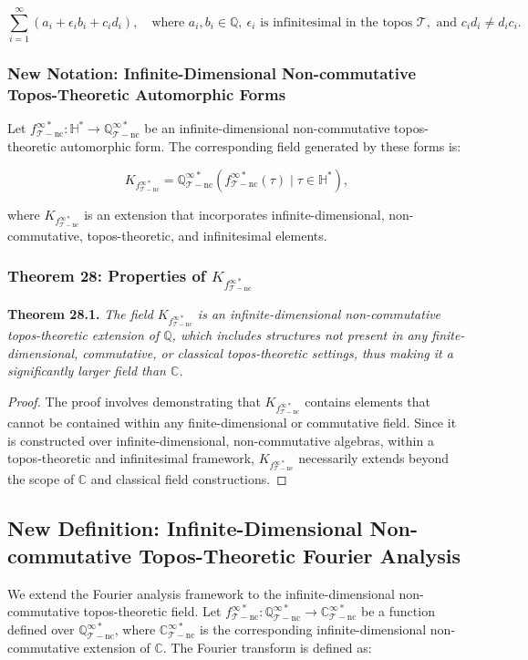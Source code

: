 \documentclass{article}
\begin{document}
\[
\sum_{i=1}^{\infty} \left( a_i + \epsilon_i b_i + c_i d_i \right), \quad \text{where } a_i, b_i \in \mathbb{Q}, \ \epsilon_i \text{ is infinitesimal in the topos } \mathcal{T}, \text{ and } c_i d_i \neq d_i c_i.
\]

\subsubsection{New Notation: Infinite-Dimensional Non-commutative Topos-Theoretic Automorphic Forms}
Let \(f_{\mathcal{T}-\text{nc}}^{\infty *}: \mathbb{H}^* \to \mathbb{Q}_{\mathcal{T}-\text{nc}}^{\infty *}\) be an infinite-dimensional non-commutative topos-theoretic automorphic form. The corresponding field generated by these forms is:

\[
K_{f_{\mathcal{T}-\text{nc}}^{\infty *}} = \mathbb{Q}_{\mathcal{T}-\text{nc}}^{\infty *}(f_{\mathcal{T}-\text{nc}}^{\infty *}(\tau) \mid \tau \in \mathbb{H}^*),
\]

where \(K_{f_{\mathcal{T}-\text{nc}}^{\infty *}}\) is an extension that incorporates infinite-dimensional, non-commutative, topos-theoretic, and infinitesimal elements.

\subsubsection{Theorem 28: Properties of \(K_{f_{\mathcal{T}-\text{nc}}^{\infty *}}\)}
\textbf{Theorem 28.1.} \textit{The field \(K_{f_{\mathcal{T}-\text{nc}}^{\infty *}}\) is an infinite-dimensional non-commutative topos-theoretic extension of \(\mathbb{Q}\), which includes structures not present in any finite-dimensional, commutative, or classical topos-theoretic settings, thus making it a significantly larger field than \(\mathbb{C}\).}

\begin{proof}
The proof involves demonstrating that \(K_{f_{\mathcal{T}-\text{nc}}^{\infty *}}\) contains elements that cannot be contained within any finite-dimensional or commutative field. Since it is constructed over infinite-dimensional, non-commutative algebras, within a topos-theoretic and infinitesimal framework, \(K_{f_{\mathcal{T}-\text{nc}}^{\infty *}}\) necessarily extends beyond the scope of \(\mathbb{C}\) and classical field constructions.
\end{proof}

\subsection{New Definition: Infinite-Dimensional Non-commutative Topos-Theoretic Fourier Analysis}
We extend the Fourier analysis framework to the infinite-dimensional non-commutative topos-theoretic field. Let \(f_{\mathcal{T}-\text{nc}}^{\infty *}: \mathbb{Q}_{\mathcal{T}-\text{nc}}^{\infty *} \to \mathbb{C}_{\mathcal{T}-\text{nc}}^{\infty *}\) be a function defined over \(\mathbb{Q}_{\mathcal{T}-\text{nc}}^{\infty *}\), where \(\mathbb{C}_{\mathcal{T}-\text{nc}}^{\infty *}\) is the corresponding infinite-dimensional non-commutative extension of \(\mathbb{C}\). The Fourier transform is defined as:
\end{document}
